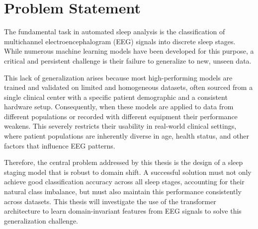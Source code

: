 \section{Problem Statement}
The fundamental task in automated sleep analysis is the classification of multichannel electroencephalogram (EEG)
signals into discrete sleep stages.
While numerous machine learning models have been developed for this purpose, a critical and
persistent challenge is their failure to generalize to new, unseen data.

This lack of generalization arises because most high-performing models are trained and validated on limited and
homogeneous datasets, often sourced from a single clinical center with a specific patient demographic and a
consistent hardware setup. Consequently, when these models are applied to data from different populations
or recorded with different equipment their performance weakens.
This severely restricts their usability in real-world clinical settings, where patient
populations are inherently diverse in age, health status, and other factors that influence EEG patterns.

Therefore, the central problem addressed by this thesis is the design of a sleep staging model
that is robust to domain shift. A successful solution must not only achieve good classification accuracy
across all sleep stages, accounting for their natural class imbalance, but must also maintain this performance
consistently across datasets.
This thesis will investigate the use of the transformer architecture to learn domain-invariant
features from EEG signals to solve this generalization challenge.

